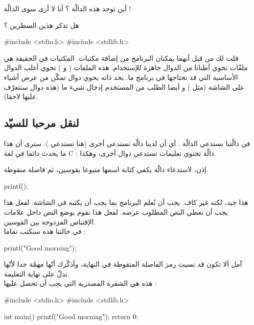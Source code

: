 \begin{question}
   أين توجد هذه الدالّة ؟ أنا لا أرى سوى الدالّة  !
\end{question}

هل تذكر هذين السطرين ؟

\begin{Csource}
#include <stdio.h>
#include <stdlib.h>
\end{Csource}

قلت لك من قبل أنهما يمكنان البرنامج من إضافة مكتبات. المكتبات في الحقيقة هي ملفّات تحوي أطنانا من الدوال جاهزة للإستخدام. هذه الملفات
( و )
 تحوي أغلب الدوال الأساسية التي قد نحتاجها في برنامج ما.
 بحد ذاته يحوي دوال تمكّن من عرض أشياء على الشاشة (مثل
 )
 و أيضا الطلب من المستخدم إدخال شيء ما (هذه دوال سنتعرّف عليها لاحقا).

\subsection{لنقل مرحبا للسيّد}
في دالّتنا
نستدعي الدالّة
 .
 أي أن لدينا دالّة تستدعي أخرى (هنا
تستدعي
).
سترى أن هذا ما يحدث دائما في لغة
\textenglish{C}
: دالّة تحتوي تعليمات تستدعي دوال أخرى، وهكذا.

إذن، لاستدعاء دالّة يكفي كتابة اسمها متبوعا بقوسين، ثم فاصلة منقوطة.

\begin{Csource}
printf();
\end{Csource}

هذا جيد، لكنه غير كاف. يجب أن نُعلم البرنامج بما يجب أن يكتبه في الشاشة. لفعل هذا يجب أن نعطي
النص المطلوب عرضه. لفعل هذا نقوم بوضع النص داخل علامات الإقتباس المزدوجة بين القوسين.\\
في حالتنا هذه سنكتب تماما :

\begin{Csource}
printf("Good morning\n");
\end{Csource}

آمل ألا تكون قد نسيت رمز الفاصلة المنقوطة في النهاية، وأذكّرك أنّها مهمّة جدا لأنّها تدلّ على نهاية التعليمة.\\
هذه هي الشفرة المصدرية التي يجب أن تحصل عليها :

\begin{Csource}
#include <stdio.h>
#include <stdlib.h>

int main()
{
    printf("Good morning");
    return 0;
}
\end{Csource}

